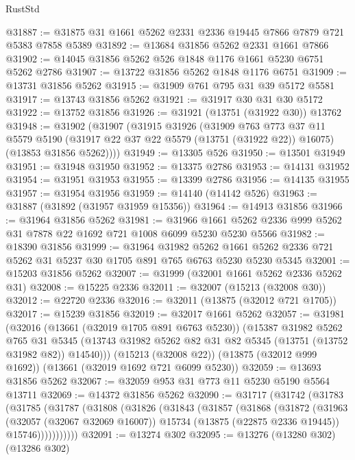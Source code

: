 \begin{lexlean}{RustStd}
\begin{coremodule}
@31887 := @31875 @31 @1661 @5262 @2331 @2336 @19445 @7866 @7879 @721 @5383 @7858 @5389
@31892 := @13684 @31856 @5262 @2331 @1661 @7866
@31902 := @14045 @31856 @5262 @526 @1848 @1176 @1661 @5230 @6751 @5262 @2786
@31907 := @13722 @31856 @5262 @1848 @1176 @6751
@31909 := @13731 @31856 @5262
@31915 := @31909 @761 @795 @31 @39 @5172 @5581
@31917 := @13743 @31856 @5262
@31921 := @31917 @30 @31 @30 @5172
@31922 := @13752 @31856
@31926 := @31921 (@13751 (@31922 @30)) @13762
@31948 := @31902
    (@31907
      (@31915
        @31926
        (@31909
          @763
          @773
          @37
          @11
          @5579
          @5190
          (@31917 @22 @37 @22 @5579 (@13751 (@31922 @22)) @16075)
          (@13853 @31856 @5262))))
@31949 := @13305 @526
@31950 := @13501 @31949
@31951 := @31948 @31950
@31952 := @13375 @2786
@31953 := @14131 @31952
@31954 := @31951 @31953
@31955 := @13399 @2786
@31956 := @14135 @31955
@31957 := @31954 @31956
@31959 := @14140 (@14142 @526)
@31963 := @31887 (@31892 (@31957 @31959 @15356))
@31964 := @14913 @31856
@31966 := @31964 @31856 @5262
@31981 := @31966 @1661 @5262 @2336 @999 @5262 @31 @7878 @22 @1692 @721 @1008 @6099 @5230 @5230 @5566
@31982 := @18390 @31856
@31999 := @31964
    @31982
    @5262
    @1661
    @5262
    @2336
    @721
    @5262
    @31
    @5237
    @30
    @1705
    @891
    @765
    @6763
    @5230
    @5230
    @5345
@32001 := @15203 @31856 @5262
@32007 := @31999 (@32001 @1661 @5262 @2336 @5262 @31)
@32008 := @15225 @2336
@32011 := @32007 (@15213 (@32008 @30))
@32012 := @22720 @2336
@32016 := @32011 (@13875 (@32012 @721 @1705))
@32017 := @15239 @31856
@32019 := @32017 @1661 @5262
@32057 := @31981
    (@32016
      (@13661 (@32019 @1705 @891 @6763 @5230))
      (@15387
        @31982
        @5262
        @765
        @31
        @5345
        (@13743 @31982 @5262 @82 @31 @82 @5345 (@13751 (@13752 @31982 @82)) @14540)))
    (@15213 (@32008 @22))
    (@13875 (@32012 @999 @1692))
    (@13661 (@32019 @1692 @721 @6099 @5230))
@32059 := @13693 @31856 @5262
@32067 := @32059 @953 @31 @773 @11 @5230 @5190 @5564 @13711
@32069 := @14372 @31856 @5262
@32090 := @31717
    (@31742
      (@31783
        (@31785
          (@31787
            (@31808
              (@31826
                (@31843
                  (@31857
                    (@31868
                      (@31872
                        (@31963
                          (@32057 (@32067 @32069 @16007))
                          @15734
                          (@13875 (@22875 @2336 @19445))
                          @15746)))))))))))
@32091 := @13274 @302
@32095 := @13276 (@13280 @302) (@13286 @302)

\end{coremodule}
\end{lexlean}
